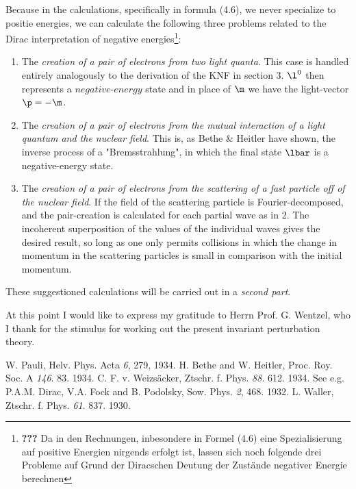 \documentclass{article}
\newcommand{\WTF}[1]{\footnote{\textbf{???} #1}}
\renewcommand{\it}[1]{\textit{#1}}
\begin{document}
Because in the calculations, specifically in formula (4.6), we never specialize to positie energies, we can calculate the following three problems related to the Dirac interpretation of negative energies\WTF{Da in den Rechnungen, inbesondere in Formel (4.6) eine Spezialisierung auf positive Energien nirgends erfolgt ist, lassen sich noch folgende drei Probleme auf Grund der Diracschen Deutung der Zustände negativer Energie berechnen}:
\begin{enumerate}
    \item The \it{creation of a pair of electrons from two light quanta}. This case is handled entirely analogously to the derivation of the KNF in section 3. $\l^0$ then represents a $\it{negative-energy}$ state and in place of $\m$ we have the light-vector $\p=-\m$.
    \item The \it{creation of a pair of electrons from the mutual interaction of a light quantum and the nuclear field}. This is, as Bethe \& Heitler\cite{2} have shown, the inverse process of a "Bremsstrahlung", in which the final state $\lbar$ is a negative-energy state.
    \item The \it{creation of a pair of electrons from the scattering of a fast particle off of the nuclear field}. If the field of the scattering particle is Fourier-decomposed, and the pair-creation is calculated for each partial wave as in 2. The incoherent superposition of the values of the individual waves gives the desired result, so long as one only permits collisions in which the change in momentum in the scattering particles is small in comparison with the initial momentum.
\end{enumerate}

These suggestioned calculations will be carried out in a \it{second part}.

At this point I would like to express my gratitude to Herrn Prof. G. Wentzel, who I thank for the stimulus for working out the present invariant perturbation theory.

\begin{thebibliography}{9}
  W. Pauli, Helv. Phys. Acta \emph{6}, 279, 1934.
  H. Bethe and W. Heitler, Proc. Roy. Soc. A \emph{146}. 83. 1934.
   C. F. v. Weizsäcker, Ztschr. f. Phys. \emph{88}. 612. 1934.
   See e.g. P.A.M. Dirac, V.A. Fock and B. Podolsky, Sow. Phys. \emph{2}, 468. 1932.
   L. Waller, Ztschr. f. Phys. \emph{61}. 837. 1930.

\end{thebibliography}
\end{document}
